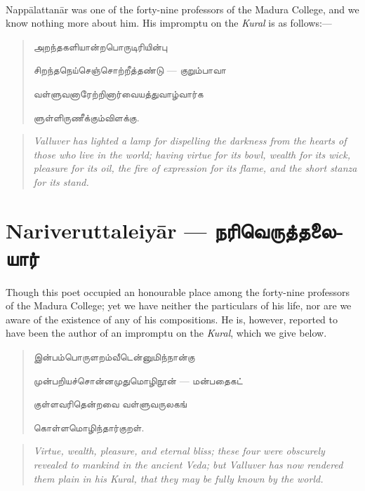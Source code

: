 \documentclass{article}
\newcommand{\TamilText}[1]{\texttamil{#1}}
\newcommand{\TamilBold}[1]{\texttamil{\textbf{#1}}}
\newcommand{\tam}[1]{\TamilText{#1}}
\newcommand{\tambold}[1]{\TamilBold{#1}}
\begin{document}
\paragraph{}
Napp\={a}lattan\={a}r was one of the forty-nine professors of the Madura College, and we know nothing more about him. His impromptu on the \emph{Kural} is as follows:---
\begin{quotation}\small
\tam{அறந்தகளியான்றபொருடிரியின்பு}

\tam{சிறந்தநெய்செஞ்சொற்றீத்தண்டு} --- \tam{குறும்பாவா}

\tam{வள்ளுவனாரேற்றினார்வையத்துவாழ்வார்க}

\tam{ளுள்ளிருணீக்கும்விளக்கு}.
\end{quotation}
\begin{quotation}\small
\emph{Valluver has lighted a lamp for dispelling the darkness from the hearts of those who live in the world; having virtue for its bowl, wealth for its wick, pleasure for its oil, the fire of expression for its flame, and the short stanza for its stand.}
\end{quotation}

\section{Nariveruttaleiy\={a}r --- \tambold{நரிவெருத்தலையார்}}
\paragraph{}
Though this poet occupied an honourable place among the forty-nine professors of the Madura College; yet we have neither the particulars of his life, nor are we aware of the existence of any of his compositions. He is, however, reported to have been the author of an impromptu on the \emph{Kural}, which we give below.
\begin{quotation}\small
\tam{இன்பம்பொருளறம்வீடென்னுமிந்நான்கு}

\tam{முன்பறியச்சொன்னமுதுமொழிநூன்‌} --- \tam{மன்பதைகட்‌}

\tam{குள்ளவரிதென்றவை வள்ளுவருலகங்‌}

\tam{கொள்ளமொழிந்தார்குறள்‌}.
\end{quotation}
\begin{quotation}\small
\emph{Virtue, wealth, pleasure, and eternal bliss; these four were obscurely revealed to mankind in the ancient Veda; but Valluver has now rendered them plain in his Kural, that they may be fully known by the world.}
\end{quotation}
\end{document}
